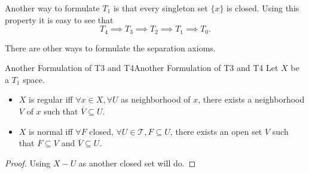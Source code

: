 \documentclass[../main.tex]{subfiles}
\begin{document}
Another way to formulate $T_1$ is that every singleton set $\{x\}$ is closed. Using this property it is easy to see that
\begin{equation*}
	T_4 \implies T_3 \implies T_2 \implies T_1 \implies T_0.
\end{equation*}

There are other ways to formulate the separation axioms.
\begin{lemma}{Another Formulation of T3 and T4}{Another Formulation of T3 and T4}
Let $X$ be a $T_1$ space.
\begin{itemize}
	\item $X$ is regular iff $\forall x\in X, \forall U$ as neighborhood of $x$, there exists a neighborhood $V$ of $x$ such that $\overline{V} \subseteq U$.
	\item $X$ is normal iff $\forall F$ closed, $\forall U\in \mathcal{T},F \subseteq U$, there exists an open set $V$ such that $F \subseteq V$ and $\overline{V} \subseteq U$.
\end{itemize}
\end{lemma}
\begin{proof}
Using $X-U$ as another closed set will do.
\end{proof}
\end{document}
